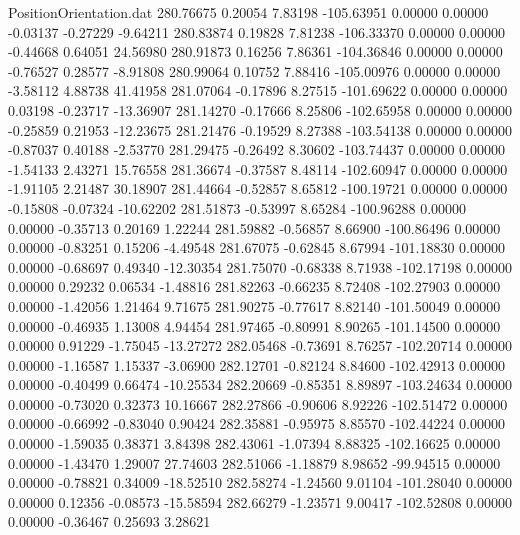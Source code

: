 \begin{filecontents}{PositionOrientation.dat}
 280.76675    0.20054    7.83198  -105.63951    0.00000    0.00000   -0.03137   -0.27229   -9.64211
 280.83874    0.19828    7.81238  -106.33370    0.00000    0.00000   -0.44668    0.64051   24.56980
 280.91873    0.16256    7.86361  -104.36846    0.00000    0.00000   -0.76527    0.28577   -8.91808
 280.99064    0.10752    7.88416  -105.00976    0.00000    0.00000   -3.58112    4.88738   41.41958
 281.07064   -0.17896    8.27515  -101.69622    0.00000    0.00000    0.03198   -0.23717  -13.36907
 281.14270   -0.17666    8.25806  -102.65958    0.00000    0.00000   -0.25859    0.21953  -12.23675
 281.21476   -0.19529    8.27388  -103.54138    0.00000    0.00000   -0.87037    0.40188   -2.53770
 281.29475   -0.26492    8.30602  -103.74437    0.00000    0.00000   -1.54133    2.43271   15.76558
 281.36674   -0.37587    8.48114  -102.60947    0.00000    0.00000   -1.91105    2.21487   30.18907
 281.44664   -0.52857    8.65812  -100.19721    0.00000    0.00000   -0.15808   -0.07324  -10.62202
 281.51873   -0.53997    8.65284  -100.96288    0.00000    0.00000   -0.35713    0.20169    1.22244
 281.59882   -0.56857    8.66900  -100.86496    0.00000    0.00000   -0.83251    0.15206   -4.49548
 281.67075   -0.62845    8.67994  -101.18830    0.00000    0.00000   -0.68697    0.49340  -12.30354
 281.75070   -0.68338    8.71938  -102.17198    0.00000    0.00000    0.29232    0.06534   -1.48816
 281.82263   -0.66235    8.72408  -102.27903    0.00000    0.00000   -1.42056    1.21464    9.71675
 281.90275   -0.77617    8.82140  -101.50049    0.00000    0.00000   -0.46935    1.13008    4.94454
 281.97465   -0.80991    8.90265  -101.14500    0.00000    0.00000    0.91229   -1.75045  -13.27272
 282.05468   -0.73691    8.76257  -102.20714    0.00000    0.00000   -1.16587    1.15337   -3.06900
 282.12701   -0.82124    8.84600  -102.42913    0.00000    0.00000   -0.40499    0.66474  -10.25534
 282.20669   -0.85351    8.89897  -103.24634    0.00000    0.00000   -0.73020    0.32373   10.16667
 282.27866   -0.90606    8.92226  -102.51472    0.00000    0.00000   -0.66992   -0.83040    0.90424
 282.35881   -0.95975    8.85570  -102.44224    0.00000    0.00000   -1.59035    0.38371    3.84398
 282.43061   -1.07394    8.88325  -102.16625    0.00000    0.00000   -1.43470    1.29007   27.74603
 282.51066   -1.18879    8.98652   -99.94515    0.00000    0.00000   -0.78821    0.34009  -18.52510
 282.58274   -1.24560    9.01104  -101.28040    0.00000    0.00000    0.12356   -0.08573  -15.58594
 282.66279   -1.23571    9.00417  -102.52808    0.00000    0.00000   -0.36467    0.25693    3.28621

\end{filecontents}
